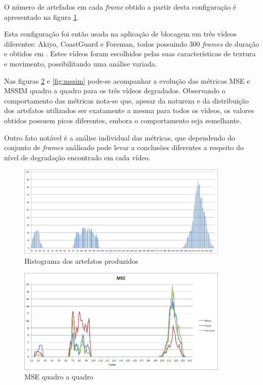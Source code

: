 O número de artefados em cada \emph{frame} obtido a partir desta configuração é apresentado na figura \ref{fig:histogram}.

Esta configuração foi então usada na aplicação de blocagem em três vídeos diferentes: Akiyo, CoastGuard e Foreman, todos possuindo 300 \emph{frames} de duração e obtidos em \cite{xiph}. Estes vídeos foram escolhidos pelas suas características de textura e movimento, possibilitando uma análise variada.

Nas figuras \ref{fig:mse} e \ref{fig:mssim} pode-se acompanhar a evolução das métricas MSE e MSSIM quadro a quadro para os três vídeos degradados. Observando o comportamento das métricas nota-se que, apesar da natureza e da distribuição dos artefatos utilizados ser exatamente a mesma para todos os vídeos, os valores obtidos possuem picos diferentes, embora o comportamento seja semelhante.

Outro fato notável é a análise individual das métricas, que dependendo do conjunto de \emph{frames} análisado pode levar a conclusões diferentes a respeito do nível de degradação encontrado em cada vídeo.

\begin{figure}[!htb]
	\centering
	\includegraphics[width=0.9\textwidth]{./imgs/histogram.png}
	\caption{Histograma dos artefatos produzidos}
	\label{fig:histogram}
\end{figure}

\begin{figure}[!htb]
	\centering
	\includegraphics[width=0.9\textwidth]{./imgs/mse.png}
	\caption{MSE quadro a quadro}
	\label{fig:mse}
\end{figure}

